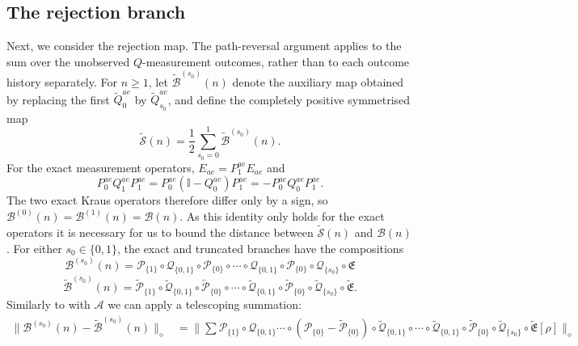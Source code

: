 \documentclass[aps,floatfix,10pt,amssymb,amsfont,amsmath,superscriptaddress,float,nofootinbib,longbibliography,nobalancelastpage,twocolumn]{revtex4-2}
\begin{document}
\subsection{The rejection branch}
\label{subsec:rejection-analysis}
\begin{widetext}
Next, we consider the rejection map.  The path-reversal argument applies to the
sum over the unobserved $Q$-measurement outcomes, rather than to each outcome
history separately.  For $n\geq 1$, let $\tilde{\mathcal{B}}^{(s_0)}(n)$ denote
the auxiliary map obtained by replacing the first $\tilde Q^{ae}_0$ by
$\tilde Q^{ae}_{s_0}$, and define the completely positive symmetrised map
\begin{equation*}
    \tilde{\mathcal{S}}(n)=\frac{1}{2}\sum_{s_0=0}^1
    \tilde{\mathcal{B}}^{(s_0)}(n).
\end{equation*}
For the exact measurement operators, $E_{ae}=P^{ae}_1E_{ae}$ and
\begin{equation*}
    P^{ae}_0Q^{ae}_1P^{ae}_1
    =P^{ae}_0(\mathbb I-Q^{ae}_0)P^{ae}_1
    =-P^{ae}_0Q^{ae}_0P^{ae}_1.
\end{equation*}
The two exact Kraus operators therefore differ only by a sign, so
$\mathcal{B}^{(0)}(n)=\mathcal{B}^{(1)}(n)=\mathcal{B}(n)$.  As this identity only holds for the exact operators it is necessary for us to bound the distance between $\tilde{\mathcal S}(n)$ and $\mathcal B(n)$. 
For either $s_0\in\{0,1\}$, the exact and truncated branches have the
compositions
\begin{equation}
    \mathcal{B}^{(s_0)}(n) = \mathcal{P}_{\{1\}}\circ\mathcal{Q}_{\{0,1\}}\circ\mathcal{P}_{\{0\}}\circ\cdots\circ\mathcal{Q}_{\{0,1\}}\circ\mathcal{P}_{\{0\}}\circ\mathcal{Q}_{\{s_0\}}\circ\mathfrak{E}
\end{equation}
\begin{equation}
    \tilde{\mathcal{B}}^{(s_0)}(n) = \tilde{\mathcal{P}}_{\{1\}}\circ\tilde {\mathcal{Q}}_{\{0,1\}}\circ\tilde{\mathcal{P}}_{\{0\}}\circ\cdots\circ\tilde{\mathcal{Q}}_{\{0,1\}}\circ\tilde{\mathcal{P}}_{\{0\}}\circ\tilde{\mathcal{Q}}_{\{s_0\}}\circ\tilde{\mathfrak{E}}.
\end{equation}
Similarly to with $\mathcal{A}$ we can apply a telescoping summation:
\begin{align}
    \|\mathcal{B}^{(s_0)}(n)-\tilde{\mathcal{B}}^{(s_0)}(n)\|_{\diamond} &= \|\sum\mathcal{P}_{\{1\}}\circ\mathcal{Q}_{\{0,1\}}\cdots\circ(\mathcal{P}_{\{0\}}-\tilde{\mathcal{P}}_{\{0\}})\circ\tilde{\mathcal{Q}}_{\{0,1\}}\circ\cdots\circ\tilde{\mathcal{Q}}_{\{0,1\}}\circ\tilde{\mathcal{P}}_{\{0\}}\circ\tilde{\mathcal{Q}}_{\{s_0\}}\circ\tilde{\mathfrak{E}}[\rho]\|_{\diamond}\\

\end{align}
\end{widetext}
\end{document}
